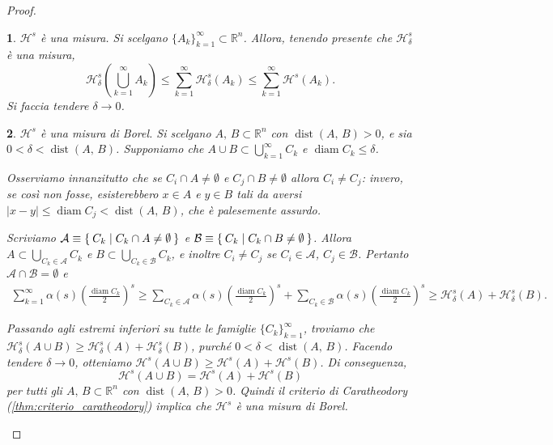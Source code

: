 \documentclass[a4paper,10pt,openright,oneside]{book}
\theoremstyle{theoremstyle}
\theoremstyle{theoremstylewoheader}
\theoremstyle{theoremstyle}
\theoremstyle{proofsecstyle}
\newtheorem{proofsec}{}
\theoremstyle{nonumberplain}
\newtheorem{proof}{Dim.}
\renewcommand{\AA}{\ensuremath{\mathcal{A}}}
\newcommand{\BB}{\ensuremath{\mathcal{B}}}
\newcommand{\RR}{\ensuremath{\mathbb{R}}}
\newcommand{\Haus}{\ensuremath{\mathcal{H}}}
\newcommand{\abs}[1]{\ensuremath{\lvert #1 \rvert}}
\DeclareMathOperator{\diam}{diam}
\DeclareMathOperator{\dist}{dist}
\begin{document}
\begin{proof}
\begin{proofsec}
\emph{$\Haus^s$ è una misura.}\hspace{.5em} Si scelgano $\{A_k\}_{k=1}^\infty \subset \RR^n$. Allora, tenendo presente che $\Haus_\delta^s$ è una misura,
\[
\Haus_\delta^s \left(\bigcup_{k=1}^\infty A_k\right) \le \sum_{k=1}^\infty \Haus_\delta^s(A_k) \le \sum_{k=1}^\infty \Haus^s(A_k).
\]
Si faccia tendere $\delta \to 0$.
\end{proofsec}

\begin{proofsec}
\emph{$\Haus^s$ è una misura di Borel.}\hspace{.5em} Si scelgano $A,\, B \subset \RR^n$ con $\dist(A,\, B) > 0$, e sia $0 < \delta < \dist(A,\, B)$. Supponiamo che $A \cup B \subset \bigcup_{k=1}^\infty C_k$ e $\diam C_k \le \delta$.

Osserviamo innanzitutto che se $C_i \cap A \ne \emptyset$ e $C_j \cap B \ne \emptyset$ allora $C_i \ne C_j$: invero, se così non fosse, esisterebbero $x \in A$ e $y \in B$ tali da aversi $\abs{x - y} \le \diam C_j < \dist(A,\, B)$, che è palesemente assurdo.

Scriviamo $\AA \equiv \Set{ C_k | C_k \cap A \ne \emptyset }$ e $\BB \equiv \Set{ C_k | C_k \cap B \ne \emptyset }$. Allora $A \subset \bigcup_{C_k \in \AA} C_k$ e $B \subset \bigcup_{C_k \in \BB} C_k$, e inoltre $C_i \ne C_j$ se $C_i \in \AA$, $C_j \in \BB$. Pertanto $\AA \cap \BB = \emptyset$ e
\begin{align*}
\sum_{k=1}^\infty \alpha(s)\left(\frac{\diam C_k}{2}\right)^s \ge \sum_{C_k \in \AA} \alpha(s)\left(\frac{\diam C_k}{2}\right)^s + \sum_{C_k \in \BB} \alpha(s)\left(\frac{\diam C_k}{2}\right)^s \ge \Haus_\delta^s(A) + \Haus_\delta^s(B).
\end{align*}

Passando agli estremi inferiori su tutte le famiglie $\{C_k\}_{k=1}^\infty$, troviamo che $\Haus_\delta^s (A \cup B) \ge \Haus_\delta^s(A) + \Haus_\delta^s(B)$, purché $0 < \delta < \dist(A,\, B)$. Facendo tendere $\delta \to 0$, otteniamo $\Haus^s(A \cup B) \ge \Haus^s(A) + \Haus^s(B)$. Di conseguenza,
\[
\Haus^s(A \cup B) = \Haus^s(A) + \Haus^s(B)
\]
per tutti gli $A,\, B \subset \RR^n$ con $\dist(A,\, B) > 0$. Quindi il criterio di Caratheodory (\ref{thm:criterio_caratheodory}) implica che $\Haus^s$ è una misura di Borel.
\end{proofsec}


\end{proof}
\end{document}
